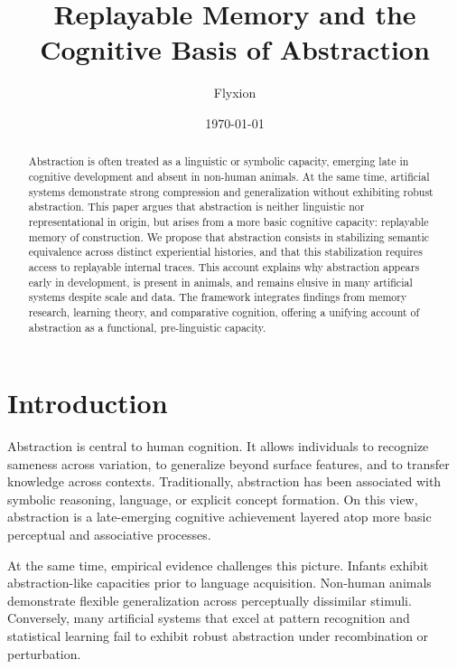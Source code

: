 \documentclass[11pt]{article}
\title{Replayable Memory and the Cognitive Basis of Abstraction}
\author{Flyxion}
\date{\today}
\begin{document}
\maketitle

\begin{abstract}
Abstraction is often treated as a linguistic or symbolic capacity, emerging late in cognitive development and absent in non-human animals. At the same time, artificial systems demonstrate strong compression and generalization without exhibiting robust abstraction. This paper argues that abstraction is neither linguistic nor representational in origin, but arises from a more basic cognitive capacity: replayable memory of construction. We propose that abstraction consists in stabilizing semantic equivalence across distinct experiential histories, and that this stabilization requires access to replayable internal traces. This account explains why abstraction appears early in development, is present in animals, and remains elusive in many artificial systems despite scale and data. The framework integrates findings from memory research, learning theory, and comparative cognition, offering a unifying account of abstraction as a functional, pre-linguistic capacity.
\end{abstract}

\section{Introduction}

Abstraction is central to human cognition. It allows individuals to recognize sameness across variation, to generalize beyond surface features, and to transfer knowledge across contexts. Traditionally, abstraction has been associated with symbolic reasoning, language, or explicit concept formation. On this view, abstraction is a late-emerging cognitive achievement layered atop more basic perceptual and associative processes.

At the same time, empirical evidence challenges this picture. Infants exhibit abstraction-like capacities prior to language acquisition. Non-human animals demonstrate flexible generalization across perceptually dissimilar stimuli. Conversely, many artificial systems that excel at pattern recognition and statistical learning fail to exhibit robust abstraction under recombination or perturbation.
\end{document}
